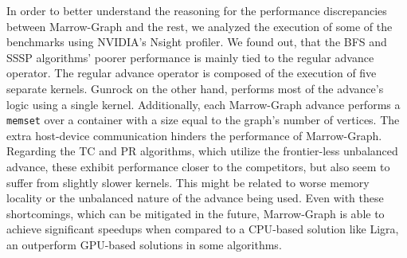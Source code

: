 In order to better understand the reasoning for the performance discrepancies between Marrow-Graph and the rest, we analyzed the execution of some of the benchmarks using NVIDIA's Nsight profiler. We found out, that the \gls{BFS} and \gls{SSSP} algorithms' poorer performance is mainly tied to the regular advance operator. The regular advance operator is composed of the execution of five separate kernels. Gunrock on the other hand, performs most of the advance's logic using a single kernel. Additionally, each Marrow-Graph advance performs a \texttt{memset} over a container with a size equal to the graph's number of vertices. The extra host-device communication hinders the performance of Marrow-Graph. Regarding the \gls{TC} and \gls{PR} algorithms, which utilize the frontier-less unbalanced advance, these exhibit performance closer to the competitors, but also seem to suffer from slightly slower kernels. This might be related to worse memory locality or the unbalanced nature of the advance being used. Even with these shortcomings, which can be mitigated in the future, Marrow-Graph is able to achieve significant speedups when compared to a \gls{CPU}-based solution like Ligra, an outperform \gls{GPU}-based solutions in some algorithms.


%

%

